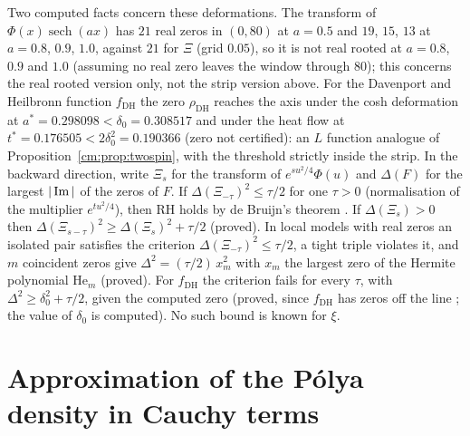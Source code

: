 \begin{remark}
Two computed facts concern these deformations. The transform of $\Phi(x)\operatorname{sech}(ax)$ has $21$ real zeros in $(0,80)$ at $a=0.5$ and $19$, $15$, $13$ at $a=0.8$, $0.9$, $1.0$, against $21$ for $\Xi$ (grid $0.05$), so it is not real rooted at $a=0.8$, $0.9$ and $1.0$ (assuming no real zero leaves the window through $80$); this concerns the real rooted version only, not the strip version above. For the Davenport and Heilbronn function $f_{\mathrm{DH}}$ the zero $\rho_{\mathrm{DH}}$ reaches the axis under the cosh deformation at $a^*=0.298098<\delta_0=0.308517$ and under the heat flow at $t^*=0.176505<2\delta_0^2=0.190366$ (zero not certified): an $L$ function analogue of Proposition~\ref{cm:prop:twospin}, with the threshold strictly inside the strip. In the backward direction, write $\Xi_s$ for the transform of $e^{su^2/4}\Phi(u)$ and $\Delta(F)$ for the largest $|\operatorname{Im}|$ of the zeros of $F$. If $\Delta(\Xi_{-\tau})^2\le\tau/2$ for one $\tau>0$ (normalisation of the multiplier $e^{tu^2/4}$), then RH holds by de Bruijn's theorem \cite{deBruijn}. If $\Delta(\Xi_s)>0$ then $\Delta(\Xi_{s-\tau})^2\ge\Delta(\Xi_s)^2+\tau/2$ (proved). In local models with real zeros an isolated pair satisfies the criterion $\Delta(\Xi_{-\tau})^2\le\tau/2$, a tight triple violates it, and $m$ coincident zeros give $\Delta^2=(\tau/2)\,x_m^2$ with $x_m$ the largest zero of the Hermite polynomial $\mathrm{He}_m$ (proved). For $f_{\mathrm{DH}}$ the criterion fails for every $\tau$, with $\Delta^2\ge\delta_0^2+\tau/2$, given the computed zero (proved, since $f_{\mathrm{DH}}$ has zeros off the line \cite{Spira94,BSO07}; the value of $\delta_0$ is computed). No such bound is known for $\xi$.
\end{remark}

\section{Approximation of the P\'olya density in Cauchy terms}\label{cm:sec:approx}

